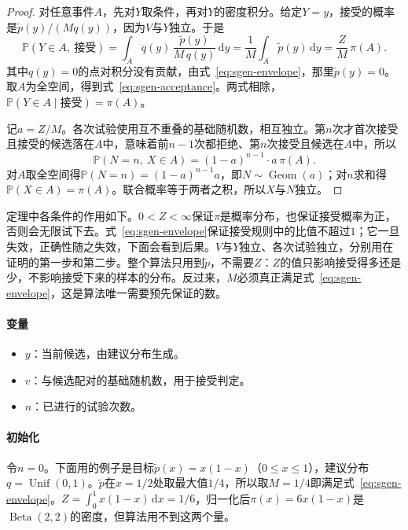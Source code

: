 \begin{proof}
对任意事件$A$，先对$Y$取条件，再对$Y$的密度积分。给定$Y=y$，接受的概率是$\widetilde{p}(y)/(Mq(y))$，因为$V$与$Y$独立。于是
\[
  \mathbb{P}(Y\in A,\ \text{接受})=\int_{A}q(y)\,\frac{\widetilde{p}(y)}{M\,q(y)}\,\mathrm{d}y=\frac{1}{M}\int_{A}\widetilde{p}(y)\,\mathrm{d}y=\frac{Z}{M}\,\pi(A).
\]
其中$q(y)=0$的点对积分没有贡献，由式~\eqref{eq:sgen-envelope}，那里$\widetilde{p}(y)=0$。取$A$为全空间，得到式~\eqref{eq:sgen-acceptance}。两式相除，$\mathbb{P}(Y\in A\mid\text{接受})=\pi(A)$。

记$a=Z/M$。各次试验使用互不重叠的基础随机数，相互独立。第$n$次才首次接受且接受的候选落在$A$中，意味着前$n-1$次都拒绝、第$n$次接受且候选在$A$中，所以
\[
  \mathbb{P}(N=n,\ X\in A)=(1-a)^{n-1}\cdot a\,\pi(A).
\]
对$A$取全空间得$\mathbb{P}(N=n)=(1-a)^{n-1}a$，即$N\sim\operatorname{Geom}(a)$；对$n$求和得$\mathbb{P}(X\in A)=\pi(A)$。联合概率等于两者之积，所以$X$与$N$独立。
\end{proof}

定理中各条件的作用如下。$0<Z<\infty$保证$\pi$是概率分布，也保证接受概率为正，否则会无限试下去。式~\eqref{eq:sgen-envelope}保证接受规则中的比值不超过$1$；它一旦失效，正确性随之失效，下面会看到后果。$V$与$Y$独立、各次试验独立，分别用在证明的第一步和第二步。整个算法只用到$\widetilde{p}$，不需要$Z$：$Z$的值只影响接受得多还是少，不影响接受下来的样本的分布。反过来，$M$必须真正满足式~\eqref{eq:sgen-envelope}，这是算法唯一需要预先保证的数。

\paragraph{变量}
\begin{itemize}
  \item $y$：当前候选，由建议分布生成。
  \item $v$：与候选配对的基础随机数，用于接受判定。
  \item $n$：已进行的试验次数。
\end{itemize}

\paragraph{初始化}
令$n=0$。下面用的例子是目标$\widetilde{p}(x)=x(1-x)$（$0\le x\le1$），建议分布$q=\operatorname{Unif}(0,1)$。$\widetilde{p}$在$x=1/2$处取最大值$1/4$，所以取$M=1/4$即满足式~\eqref{eq:sgen-envelope}。$Z=\int_0^1x(1-x)\,\mathrm{d}x=1/6$，归一化后$\pi(x)=6x(1-x)$是$\operatorname{Beta}(2,2)$的密度，但算法用不到这两个量。

